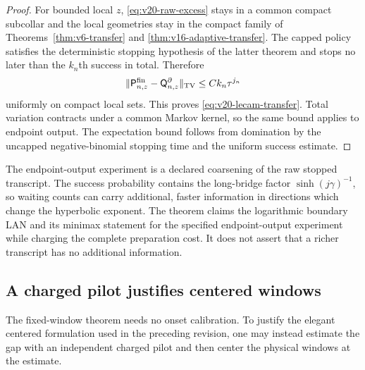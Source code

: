 \begin{proof}
For bounded local $z$, \eqref{eq:v20-raw-excess} stays in a common compact
subcollar and the local geometries stay in the compact family of
Theorems~\ref{thm:v6-transfer} and \ref{thm:v16-adaptive-transfer}.  The
capped policy satisfies the deterministic stopping hypothesis of the latter
theorem and stops no later than the $k_n$th success in total.  Therefore
\[
 \|\mathsf P_{n,z}^{\rm fin}-\mathsf Q_{n,z}^{\partial}\|_{\rm TV}
 \le Ck_n\tau^{j_n}
\]
uniformly on compact local sets.  This proves
\eqref{eq:v20-lecam-transfer}.  Total variation contracts under a common
Markov kernel, so the same bound applies to endpoint output.  The expectation
bound follows from domination by the uncapped negative-binomial stopping time
and the uniform success estimate.
\end{proof}

\begin{remark}
The endpoint-output experiment is a declared coarsening of the raw stopped
transcript.  The success probability contains the long-bridge factor
$\sinh(j\gamma)^{-1}$, so waiting counts can carry additional, faster
information in directions which change the hyperbolic exponent.  The theorem
claims the logarithmic boundary LAN and its minimax statement for the
specified endpoint-output experiment while charging the complete preparation
cost.  It does not assert that a richer transcript has no additional
information.
\end{remark}

\subsection{A charged pilot justifies centered windows}

The fixed-window theorem needs no onset calibration.  To justify the elegant
centered formulation used in the preceding revision, one may instead estimate
the gap with an independent charged pilot and then center the physical
windows at the estimate.

